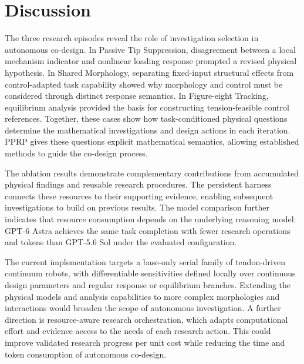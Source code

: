 \section{Discussion}
\label{sec:discussion}

The three research episodes reveal the role of investigation selection in autonomous co-design. In Passive Tip Suppression, disagreement between a local mechanism indicator and nonlinear loading response prompted a revised physical hypothesis. In Shared Morphology, separating fixed-input structural effects from control-adapted task capability showed why morphology and control must be considered through distinct response semantics. In Figure-eight Tracking, equilibrium analysis provided the basis for constructing tension-feasible control references. Together, these cases show how task-conditioned physical questions determine the mathematical investigations and design actions in each iteration. PPRP gives these questions explicit mathematical semantics, allowing established methods to guide the co-design process.

The ablation results demonstrate complementary contributions from accumulated physical findings and reusable research procedures. The persistent harness connects these resources to their supporting evidence, enabling subsequent investigations to build on previous results. The model comparison further indicates that resource consumption depends on the underlying reasoning model: GPT-6 Astra achieves the same task completion with fewer research operations and tokens than GPT-5.6 Sol under the evaluated configuration.

The current implementation targets a base-only serial family of tendon-driven continuum robots, with differentiable sensitivities defined locally over continuous design parameters and regular response or equilibrium branches. Extending the physical models and analysis capabilities to more complex morphologies and interactions would broaden the scope of autonomous investigation. A further direction is resource-aware research orchestration, which adapts computational effort and evidence access to the needs of each research action. This could improve validated research progress per unit cost while reducing the time and token consumption of autonomous co-design.

